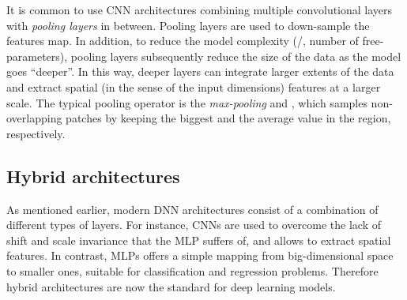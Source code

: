 It is common to use \ac{CNN} architectures combining multiple convolutional layers with \textit{pooling layers} in between.
Pooling layers are used to down-sample the features map.
In addition, to reduce the model complexity (\ie/, number of free-parameters), pooling layers subsequently reduce the size of the data as the model goes ``deeper''.
In this way, deeper layers can integrate larger extents of the data and extract spatial (in the sense of the input dimensions) features at a larger scale.
The typical pooling operator is the \textit{max-pooling} and , which samples non-overlapping patches by keeping the biggest and the average value in the region, respectively.

\subsection{Hybrid architectures}
As mentioned earlier, modern \ac{DNN} architectures consist of a combination of different types of layers.
For instance, \acp{CNN} are used to overcome the lack of shift and scale invariance that the \ac{MLP} suffers of, and allows to extract spatial features.
In contrast, \acp{MLP} offers a simple mapping from big-dimensional space to smaller ones, suitable for classification and regression problems.
Therefore hybrid architectures are now the standard for deep learning models.

